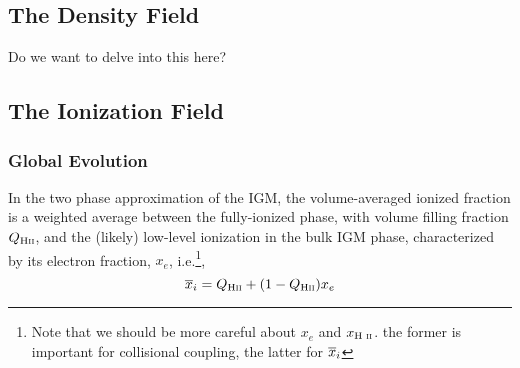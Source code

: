 

\subsection{The Density Field}
{\color{red} Do we want to delve into this here?}

\subsection{The Ionization Field}

\subsubsection{Global Evolution} \label{sec:ionization_global}
In the two phase approximation of the IGM, the volume-averaged ionized fraction is a weighted average between the fully-ionized phase, with volume filling fraction $Q_{\text{H} {\textsc{ii}}}$, and the (likely) low-level ionization in the bulk IGM phase, characterized by its electron fraction, $x_e$, i.e.\footnote{{\color{red} Note that we should be more careful about $x_e$ and $x_{\text{H } \textsc{ii}}$. the former is important for collisional coupling, the latter for $\overline{x}_i$} },
\begin{equation}
	\overline{x}_i = Q_{\text{H} {\textsc{ii}}} + (1 - Q_{\text{H} {\textsc{ii}}}) x_e
\end{equation}


